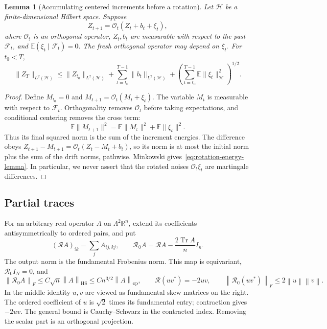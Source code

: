 \documentclass[11pt]{article}
\newtheorem{lemma}[theorem]{Lemma}
\theoremstyle{definition}\newtheorem{definition}[theorem]{Definition}
\theoremstyle{remark}\newtheorem{remark}[theorem]{Remark}
\DeclareMathOperator{\Tr}{Tr}
\newcommand{\E}{\mathbb E}
\newcommand{\R}{\mathcal R}
\newcommand{\op}{\mathrm{op}}
\newcommand{\HS}{\mathrm{HS}}
\newcommand{\norm}[1]{\left\lVert#1\right\rVert}
\begin{document}
\begin{lemma}[Accumulating centered increments before a rotation]\label{lem:rotated-energy}
Let $\mathcal H$ be a finite-dimensional Hilbert space. Suppose
\[
 Z_{t+1}=\mathcal O_t(Z_t+b_t+\xi_t),
\]
where $\mathcal O_t$ is an orthogonal operator, $Z_t,b_t$ are measurable with respect to the past $\mathcal F_t$, and $\E(\xi_t\mid\mathcal F_t)=0$. The fresh orthogonal operator may depend on $\xi_t$. For $t_0<T$,
\begin{equation}\label{eq:rotation-energy-lemma}
 \|Z_T\|_{L^2(\mathcal H)}
 \le \|Z_{t_0}\|_{L^2(\mathcal H)}
 +\sum_{t=t_0}^{T-1}\|b_t\|_{L^2(\mathcal H)}
 +\left(\sum_{t=t_0}^{T-1}\E\|\xi_t\|_{\mathcal H}^2\right)^{1/2}.
\end{equation}
\end{lemma}
\begin{proof}
Define $M_{t_0}=0$ and $M_{t+1}=\mathcal O_t(M_t+\xi_t)$. The variable $M_t$ is measurable with respect to $\mathcal F_t$. Orthogonality removes $\mathcal O_t$ before taking expectations, and conditional centering removes the cross term:
\[
 \E\|M_{t+1}\|^2=\E\|M_t\|^2+\E\|\xi_t\|^2.
\]
Thus its final squared norm is the sum of the increment energies. The difference obeys
$Z_{t+1}-M_{t+1}=\mathcal O_t(Z_t-M_t+b_t)$, so its norm is at most the initial norm plus the sum of the drift norms, pathwise. Minkowski gives~\eqref{eq:rotation-energy-lemma}. In particular, we never assert that the rotated noises $\mathcal O_t\xi_t$ are martingale differences.
\end{proof}

\subsection{Partial traces}
For an arbitrary real operator $A$ on $\Lambda^2\mathbb R^n$, extend its coefficients antisymmetrically to ordered pairs, and put
\begin{equation}\label{eq:Rdef}
 (\R A)_{ik}=\sum_j A_{ij,kj},\qquad
 \R_0A=\R A-\frac{2\Tr A}{n}I_n.
\end{equation}
The output norm is the fundamental Frobenius norm. This map is equivariant, $\R_0 I_N=0$, and
\begin{equation}\label{eq:Rbounds}
 \norm{\R_0 A}_F\le C\sqrt n\norm A_{\HS}
 \le Cn^{3/2}\norm A_{\op},\qquad
 \R(uv^*)=-2uv,\qquad
 \norm{\R_0(uv^*)}_F\le2\norm u\norm v.
\end{equation}
In the middle identity $u,v$ are viewed as fundamental skew matrices on the right. The ordered coefficient of $u$ is $\sqrt2$ times its fundamental entry; contraction gives $-2uv$. The general bound is Cauchy--Schwarz in the contracted index. Removing the scalar part is an orthogonal projection.
\end{document}
